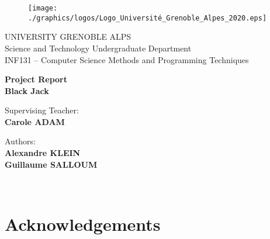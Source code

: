 \documentclass[a4paper, twoside]{report}
\begin{document}





\begin{titlepage}
\begin{figure}[!htb]
    \centering
    \texttt{[image: ./graphics/logos/Logo\_Université\_Grenoble\_Alpes\_2020.eps]}
\end{figure}

\begin{center}
    \LARGE{UNIVERSITY GRENOBLE ALPS}
    \vspace{5mm}
    \\ \large{Science and Technology Undergraduate Department}
    \vspace{5mm}
    \\ \LARGE{INF131 -- Computer Science Methods and Programming Techniques}
\end{center}

\vspace{15mm}
\begin{center}
    {\LARGE{\bf Project Report\\\vspace{5mm}Black Jack}}
\end{center}
\vspace{30mm}

\begin{minipage}[t]{0.47\textwidth}
	{\large{Supervising Teacher:}{\normalsize\vspace{3mm}
	\bf\\ \large{Carole ADAM \vspace{2mm}\\ }}}
\end{minipage}
\hfill
\begin{minipage}[t]{0.47\textwidth}\raggedleft
	{\large{Authors:}{\normalsize\vspace{3mm}
    \bf\\ \large{Alexandre KLEIN \vspace{2mm}\\Guillaume SALLOUM }}}
\end{minipage}

\vspace{30mm}
\hrulefill
\\

\end{titlepage}




\chapter*{Acknowledgements}
\end{document}
